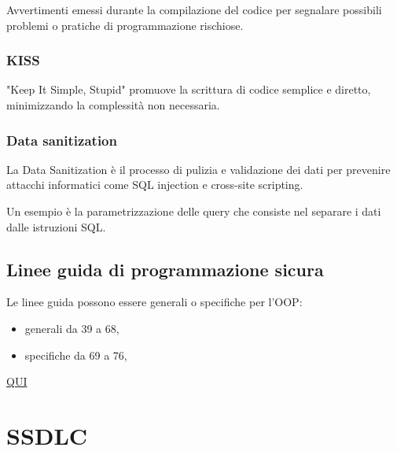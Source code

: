 \documentclass[
]{article}
\providecommand{\tightlist}{%
  \setlength{\itemsep}{0pt}\setlength{\parskip}{0pt}}
\begin{document}
{Avvertimenti emessi durante la compilazione del codice per segnalare
possibili problemi o pratiche di programmazione rischiose.}

\subsubsection{\texorpdfstring{{KISS}}{KISS}}\label{h.bzb0stxtahee}

{"Keep It Simple, Stupid" promuove la scrittura di codice semplice e
diretto, minimizzando la complessità non necessaria. }

\subsubsection{\texorpdfstring{{Data
sanitization}}{Data sanitization}}\label{h.q1nigs895ue0}

{La Data Sanitization è il processo di pulizia e validazione dei dati
per prevenire attacchi informatici come SQL injection e cross-site
scripting.}

{}

{Un esempio è la parametrizzazione delle query che consiste nel separare
i dati dalle istruzioni SQL.}

\subsection{\texorpdfstring{{Linee guida di programmazione
sicura}}{Linee guida di programmazione sicura}}\label{h.61h055chp5y7}

{Le linee guida possono essere generali o specifiche per }{l'OOP:}

\begin{itemize}
\tightlist
\item
  {generali da 39 a 68,}
\item
  {specifiche da 69 a 76,}
\end{itemize}

{\href{https://www.google.com/url?q=https://virtuale.unibo.it/pluginfile.php/2032357/mod_resource/content/1/Laboratorio\%2520di\%2520sicurezza\%2520dei\%2520sistemi\%2520informatici\%2520e\%2520privacy\%2520-\%252005\%2520Sviluppo\%2520sicuro\%2520-\%2520V1R0.pdf&sa=D&source=editors&ust=1734628852128080&usg=AOvVaw0jZ4aUXHH_05edNi7lKta4}{QUI}}

\section{\texorpdfstring{{SSDLC}}{SSDLC}}\label{h.2upp1hdeg1ec}
\end{document}
